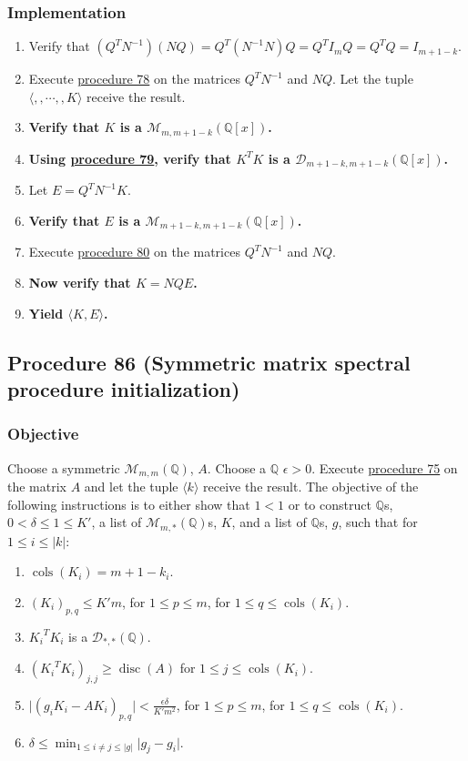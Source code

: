 \documentclass[twocolumn]{article}
\DeclareMathOperator{\disc}{disc}
\DeclareMathOperator{\cols}{cols}
\begin{document}
			\subsubsection{Implementation}
				\begin{enumerate}
					\item Verify that $(Q^TN^{-1})(NQ)=Q^T(N^{-1}N)Q=Q^TI_mQ=Q^TQ=I_{m+1-k}$.
					\item Execute \hyperref[sec:procedure 78]{procedure 78} on the matrices $Q^TN^{-1}$ and $NQ$. Let the tuple $\langle ,,\cdots,,K\rangle$ receive the result.
					\item \textbf{Verify that $K$ is a $\mathcal{M}_{m,m+1-k}(\mathbb{Q}[x])$.}
					\item \textbf{Using \hyperref[sec:procedure 79]{procedure 79}, verify that $K^TK$ is a $\mathcal{D}_{m+1-k,m+1-k}(\mathbb{Q}[x])$.}
					\item Let $E=Q^TN^{-1}K$.
					\item \textbf{Verify that $E$ is a $\mathcal{M}_{m+1-k,m+1-k}(\mathbb{Q}[x])$.}
					\item Execute \hyperref[sec:procedure 80]{procedure 80} on the matrices $Q^TN^{-1}$ and $NQ$.
					\item \textbf{Now verify that $K=NQE$.}
					\item \textbf{Yield $\langle K,E\rangle$.}
				\end{enumerate}
		\subsection{Procedure 86 (Symmetric matrix spectral procedure initialization)}\label{sec:procedure 86}
			\subsubsection{Objective}
				Choose a symmetric $\mathcal{M}_{m,m}(\mathbb{Q})$, $A$. Choose a $\mathbb{Q}$ $\epsilon>0$. Execute \hyperref[sec:procedure 75]{procedure 75} on the matrix $A$ and let the tuple $\langle k\rangle$ receive the result. The objective of the following instructions is to either show that $1<1$ or to construct $\mathbb{Q}$s, $0<\delta\le 1\le K'$, a list of $\mathcal{M}_{m,*}(\mathbb{Q})$s, $K$, and a list of $\mathbb{Q}$s, $g$, such that for $1\le i\le\lvert k\rvert$:
				\begin{enumerate}
					\item $\cols(K_i)=m+1-k_i$.
					\item $(K_i)_{p,q}\le K'm$, for $1\le p\le m$, for $1\le q\le\cols(K_i)$.
					\item ${K_i}^T{K_i}$ is a $\mathcal{D}_{*,*}(\mathbb{Q})$.
					\item $({K_i}^T{K_i})_{j,j}\ge\disc(A)$ for $1\le j\le\cols(K_i)$.
					\item $\lvert(g_iK_i-AK_i)_{p,q}\rvert<\frac{\epsilon\delta}{K'm^2}$, for $1\le p\le m$, for $1\le q\le\cols(K_i)$.
					\item $\delta\le\min_{1\le i\ne j\le\lvert g\rvert}\lvert g_j-g_i\rvert$.
				\end{enumerate}
\end{document}

